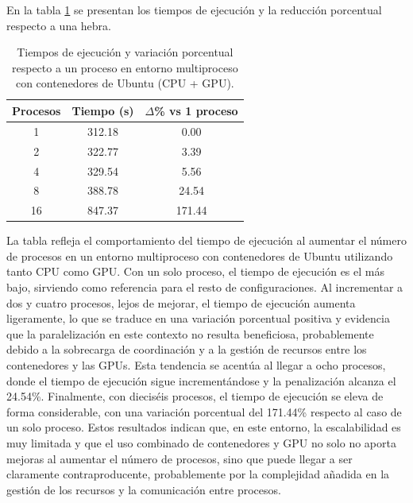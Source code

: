 En la tabla \ref{tab:multi-node_ubuntu_docker_gpu} se presentan los tiempos de ejecución y la reducción porcentual respecto a una hebra.

\begin{table}[ht]
    \centering
    \begin{tabular}{|c|c|c|}
        \hline
        \textbf{Procesos} & \textbf{Tiempo (s)} & \textbf{$\Delta$\% vs 1 proceso} \\
        \hline
        1                 & 312.18              & 0.00                             \\
        2                 & 322.77              & 3.39                             \\
        4                 & 329.54              & 5.56                             \\
        8                 & 388.78              & 24.54                            \\
        16                & 847.37              & 171.44                           \\
        \hline
    \end{tabular}
    \caption{Tiempos de ejecución y variación porcentual respecto a un proceso en entorno multiproceso con contenedores de Ubuntu (CPU + GPU).}
    \label{tab:multi-node_ubuntu_docker_gpu}
\end{table}

La tabla refleja el comportamiento del tiempo de ejecución al aumentar el número de procesos en un entorno multiproceso con contenedores de Ubuntu utilizando tanto CPU como GPU. Con un solo proceso, el tiempo de ejecución es el más bajo, sirviendo como referencia para el resto de configuraciones. Al incrementar a dos y cuatro procesos, lejos de mejorar, el tiempo de ejecución aumenta ligeramente, lo que se traduce en una variación porcentual positiva y evidencia que la paralelización en este contexto no resulta beneficiosa, probablemente debido a la sobrecarga de coordinación y a la gestión de recursos entre los contenedores y las GPUs. Esta tendencia se acentúa al llegar a ocho procesos, donde el tiempo de ejecución sigue incrementándose y la penalización alcanza el 24.54\%. Finalmente, con dieciséis procesos, el tiempo de ejecución se eleva de forma considerable, con una variación porcentual del 171.44\% respecto al caso de un solo proceso. Estos resultados indican que, en este entorno, la escalabilidad es muy limitada y que el uso combinado de contenedores y GPU no solo no aporta mejoras al aumentar el número de procesos, sino que puede llegar a ser claramente contraproducente, probablemente por la complejidad añadida en la gestión de los recursos y la comunicación entre procesos.

